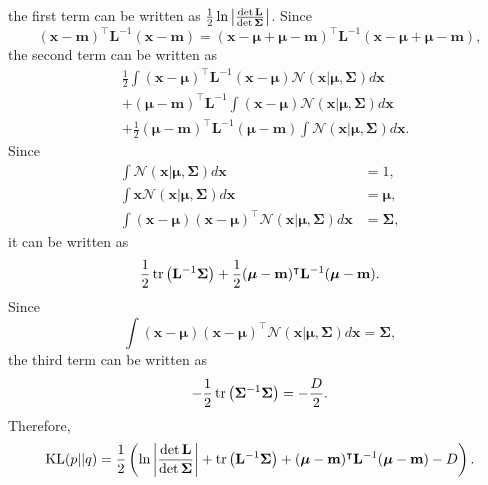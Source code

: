 %
the first term can be written as $\frac{1}{2} \ln \abs{\frac{\det \mathbf{L}}{\det \bm{\Sigma}}}$.
Since
%
\begin{equation}
(\mathbf{x} - \mathbf{m}) ^ \intercal 
\mathbf{L} ^ {- 1} 
(\mathbf{x} - \mathbf{m}) 
= 
(\mathbf{x} - \bm{\mu} + \bm{\mu} - \mathbf{m}) ^ \intercal 
\mathbf{L} ^ {- 1} 
(\mathbf{x} - \bm{\mu} + \bm{\mu} - \mathbf{m}),
\end{equation}
%
the second term can be written as
%
\begin{equation}
\begin{aligned}
&
\frac{1}{2} 
\int 
(\mathbf{x} - \bm{\mu}) ^ \intercal 
\mathbf{L} ^ {- 1} 
(\mathbf{x} - \bm{\mu}) 
\mathcal{N} (\mathbf{x} | \bm{\mu}, \bm{\Sigma}) 
d\mathbf{x} 
\\
&
+ 
(\bm{\mu} - \mathbf{m}) ^ \intercal 
\mathbf{L} ^ {- 1} 
\int 
(\mathbf{x} - \bm{\mu}) 
\mathcal{N} (\mathbf{x} | \bm{\mu}, \bm{\Sigma}) 
d\mathbf{x} 
\\
&
+ 
\frac{1}{2} 
(\bm{\mu} - \mathbf{m}) ^ \intercal 
\mathbf{L} ^ {- 1} 
(\bm{\mu} - \mathbf{m}) 
\int 
\mathcal{N} (\mathbf{x} | \bm{\mu}, \bm{\Sigma}) 
d\mathbf{x}.
\end{aligned}
\end{equation}
%
Since
%
\begin{equation}
\begin{aligned}
\int 
\mathcal{N} (\mathbf{x} | \bm{\mu}, \bm{\Sigma}) 
d\mathbf{x} 
&= 
1, \\
\int 
\mathbf{x}
\mathcal{N} (\mathbf{x} | \bm{\mu}, \bm{\Sigma}) 
d\mathbf{x} 
&=
\bm{\mu}, 
\\
\int 
(\mathbf{x} - \bm{\mu}) 
(\mathbf{x} - \bm{\mu}) ^ \intercal 
\mathcal{N} (\mathbf{x} | \bm{\mu}, \bm{\Sigma}) 
d\mathbf{x} 
&= 
\bm{\Sigma},
\end{aligned}
\end{equation}
%
it can be written as
%
\begin{equation}
\frac{1}{2} 
\tr 
\left( 
	\mathbf{L} ^ {- 1} 
	\bm{\Sigma} 
\right)
+ 
\frac{1}{2} 
(\bm{\mu} - \mathbf{m}) ^ \intercal 
\mathbf{L} ^ {- 1} 
(\bm{\mu} -  \mathbf{m}).
\end{equation}
%
Since
%
\begin{equation}
\int 
(\mathbf{x} - \bm{\mu}) 
(\mathbf{x} - \bm{\mu}) ^ \intercal 
\mathcal{N} (\mathbf{x} | \bm{\mu}, \bm{\Sigma}) 
d\mathbf{x} 
= 
\bm{\Sigma},
\end{equation}
%
the third term can be written as
%
\begin{equation}
- 
\frac{1}{2} 
\tr 
\left( 
	\bm{\Sigma} ^ {- 1} 
	\bm{\Sigma} 
\right) 
= 
- 
\frac{D}{2}.
\end{equation}
%
Therefore,
%
\begin{equation}
{\rm KL} (p || q) 
= 
\frac{1}{2} 
\left( 
	\ln \abs{\frac{\det \mathbf{L}}{\det \bm{\Sigma}}} 
	+ 
	\tr 
	\left( 
		\mathbf{L} ^ {- 1} 
		\bm{\Sigma} 
	\right) 
	+ 
	(\bm{\mu} - \mathbf{m}) ^ \intercal 
	\mathbf{L} ^ {- 1} 
	(\bm{\mu} - \mathbf{m}) 
	- 
	D 
\right).
\end{equation}
%


